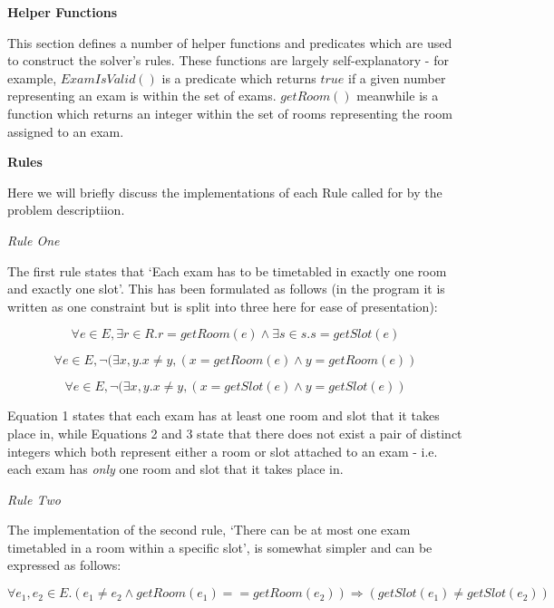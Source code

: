 \documentclass[11pt]{article}
\begin{document}
	\textbf{Helper Functions}

	This section defines a number of helper functions and predicates which are used to construct the solver's rules. These functions are largely self-explanatory - for example, \(ExamIsValid()\) is a predicate which returns \(true\) if a given number representing an exam is within the set of exams. \(getRoom()\) meanwhile is a function which returns an integer within the set of rooms representing the room assigned to an exam.\newline

	\textbf{Rules}
	
	Here we will briefly discuss the implementations of each Rule called for by the problem descriptiion.\newline

	\textit{Rule One}

	The first rule states that `Each exam has to be timetabled in exactly one room and exactly one slot'. This has been formulated as follows (in the program it is written as one constraint but is split into three here for ease of presentation):

	\begin{equation}
		\forall e \in E, \exists r \in R . r = getRoom(e) \land \exists s \in s . s = getSlot(e)
	\end{equation}

	\begin{equation}
		\forall e \in E, \lnot(\exists x,y . x \neq y, (x = getRoom(e) \land y = getRoom(e))
	\end{equation}

	\begin{equation}
		\forall e \in E, \lnot(\exists x,y . x \neq y, (x = getSlot(e) \land y = getSlot(e))
	\end{equation}

	Equation 1 states that each exam has at least one room and slot that it takes place in, while Equations 2 and 3 state that there does not exist a pair of distinct integers which both represent either a room or slot attached to an exam - i.e. each exam has \textit{only} one room and slot that it takes place in.\newline

	\textit{Rule Two}

	The implementation of the second rule, `There can be at most one exam timetabled in a room within a specific slot', is somewhat simpler and can be expressed as follows:

	\begin{equation}
		\forall e_1,e_2 \in E . (e_1 \neq e_2 \land getRoom(e_1) == getRoom(e_2)) \Rightarrow (getSlot(e_1) \neq getSlot(e_2))
	\end{equation}
\end{document}

